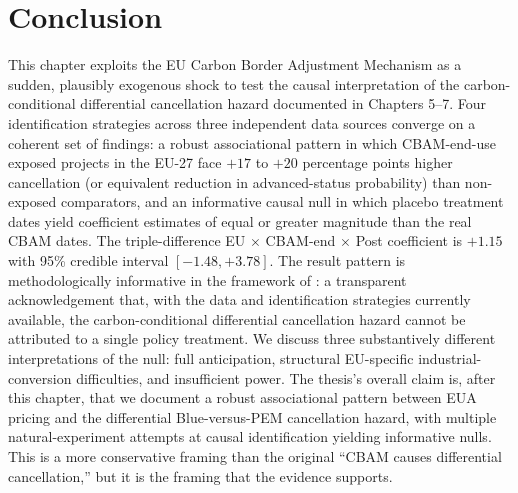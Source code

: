 \documentclass[11pt,a4paper]{article}
\begin{document}
\section{Conclusion}
\label{sec:ch8-conclusion}

This chapter exploits the EU Carbon Border Adjustment Mechanism as a sudden, plausibly exogenous shock to test the causal interpretation of the carbon-conditional differential cancellation hazard documented in Chapters 5--7. Four identification strategies across three independent data sources converge on a coherent set of findings: a robust associational pattern in which CBAM-end-use exposed projects in the EU-27 face $+17$ to $+20$ percentage points higher cancellation (or equivalent reduction in advanced-status probability) than non-exposed comparators, and an informative causal null in which placebo treatment dates yield coefficient estimates of equal or greater magnitude than the real CBAM dates. The triple-difference EU $\times$ CBAM-end $\times$ Post coefficient is $+1.15$ with 95\% credible interval $[-1.48, +3.78]$. The result pattern is methodologically informative in the framework of \citet{ketel2023unimportance}: a transparent acknowledgement that, with the data and identification strategies currently available, the carbon-conditional differential cancellation hazard cannot be attributed to a single policy treatment. We discuss three substantively different interpretations of the null: full anticipation, structural EU-specific industrial-conversion difficulties, and insufficient power. The thesis's overall claim is, after this chapter, that we document a robust associational pattern between EUA pricing and the differential Blue-versus-PEM cancellation hazard, with multiple natural-experiment attempts at causal identification yielding informative nulls. This is a more conservative framing than the original ``CBAM causes differential cancellation,'' but it is the framing that the evidence supports.
\end{document}

